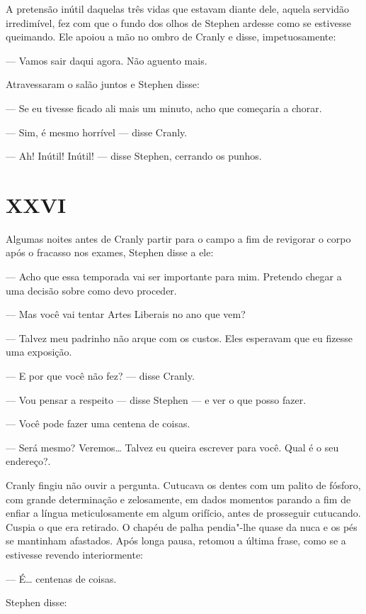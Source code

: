 A pretensão inútil daquelas três vidas que estavam diante dele,
aquela servidão irredimível, fez com que o fundo dos olhos de Stephen
ardesse como se estivesse queimando.  Ele apoiou a mão no
ombro de Cranly e disse, impetuosamente:

--- Vamos sair daqui agora.  Não aguento mais.

Atravessaram o salão juntos e Stephen disse:

--- Se eu tivesse ficado ali mais um minuto, acho que começaria a
chorar.

--- Sim, é mesmo horrível --- disse Cranly.

--- Ah!  Inútil!  Inútil! --- disse Stephen, cerrando os punhos.


\section*{XXVI}

Algumas noites antes de Cranly partir para o campo a fim de
revigorar o corpo após o fracasso nos exames, Stephen disse a ele:

--- Acho que essa temporada vai ser importante para mim. 
Pretendo chegar a uma decisão sobre como devo proceder.

--- Mas você vai tentar Artes Liberais no ano que vem?

--- Talvez meu padrinho não arque com os custos.  Eles esperavam
que eu fizesse uma exposição.

--- E por que você não fez? --- disse Cranly.

--- Vou pensar a respeito --- disse Stephen --- e ver o que posso
fazer.

--- Você pode fazer uma centena de coisas.

--- Será mesmo?  Veremos\ldots{}  Talvez eu queira escrever para você.
\label{qual"-e} Qual é o seu endereço?.

Cranly fingiu não ouvir a pergunta.  Cutucava os dentes com um
palito de fósforo, com grande determinação \label{e"-zelosamente} e zelosamente, em dados
momentos parando a fim de enfiar a língua meticulosamente em algum
orifício, antes de prosseguir cutucando.  Cuspia o que era retirado. 
O chapéu de palha pendia"-lhe quase da nuca e os pés se mantinham
afastados.  Após longa pausa, retomou a última frase, como se a
estivesse revendo interiormente:

--- É\ldots{} centenas de coisas.

Stephen disse:

